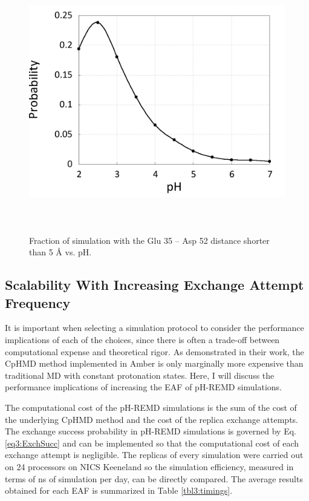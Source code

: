 \begin{figure}
 \includegraphics[width=6in, height=4.5in]{Catalytic_Distances_Int.png}
 \caption{Fraction of simulation with the Glu 35 -- Asp 52 distance shorter than
          5 \mbox{\normalfont \AA} vs. pH.}
 \label{fig3:cat_dist_int}
\end{figure}

\subsection{Scalability With Increasing Exchange Attempt Frequency}

It is important when selecting a simulation protocol to consider the performance
implications of each of the choices, since there is often a trade-off between
computational expense and theoretical rigor.  As
\citeauthor{Mongan_JComputChem_2004_v25_p2038} demonstrated in their work, the
CpHMD method implemented in Amber is only marginally more expensive than
traditional MD with constant protonation states.
\cite{Mongan_JComputChem_2004_v25_p2038}  Here, I will discuss the performance
implications of increasing the EAF of pH-REMD simulations.

The computational cost of the pH-REMD simulations is the sum of the cost of the
underlying CpHMD method \cite{Mongan_JComputChem_2004_v25_p2038} and the cost of
the replica exchange attempts.  The exchange success probability in pH-REMD
simulations is governed by Eq. \ref{eq3:ExchSucc} and can be implemented so that
the computational cost of each exchange attempt is negligible.  The replicas of
every simulation were carried out on 24 processors on NICS Keeneland
\cite{Vetter2011} so the simulation efficiency, measured in terms of ns of
simulation per day, can be directly compared. The average results obtained for
each EAF is summarized in Table \ref{tbl3:timings}.

